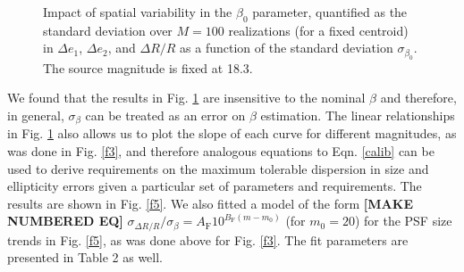 \documentclass[11pt,preprint,flushrt]{aastex}
\begin{document}
\begin{figure}[!h]
\centering
{}
\caption{Impact of spatial variability in the $\beta_0$ parameter, quantified as the standard deviation over $M=100$ realizations (for a fixed centroid) in $\Delta e_1$,  $\Delta e_2$, and $\Delta R/R$  as a function of the standard deviation $ \sigma_{\beta_0}$. 
The source magnitude is fixed at 18.3.}
\label{f4}
\end{figure}
We found that the results in Fig. \ref{f4} are insensitive to the nominal $\beta$ and therefore, in general, $\sigma_{\beta}$  can be treated as an error on $\beta$ estimation. The linear relationships in Fig. \ref{f4} also allows us to plot the slope of each curve for different magnitudes, as was done in Fig. \ref{f3}, and therefore analogous equations to Eqn. \ref{calib} can be used to derive requirements on the maximum tolerable dispersion in size and ellipticity errors given a particular set of parameters and requirements. The results are shown in Fig. \ref{f5}. We also fitted a model of the form \textbf{[MAKE NUMBERED EQ]} $\sigma_{\Delta R/ R}/ \sigma_{\beta} = A_{\text{F}}10^{B_{\text{F}} (m - m_{0})}$ (for $m_0 =20$) for the PSF size trends in Fig. \ref{f5}, as was done above for Fig. \ref{f3}. The fit parameters are presented in Table 2 as well.  
\end{document}
